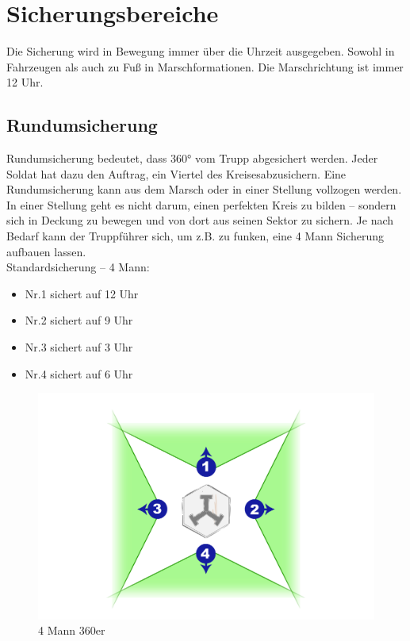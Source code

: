 \pagebreak

\section{Sicherungsbereiche}
	Die Sicherung wird in Bewegung immer über die Uhrzeit ausgegeben. Sowohl in Fahrzeugen als auch zu Fuß in Marschformationen.  Die Marschrichtung ist immer 12 Uhr. \\

\subsection{Rundumsicherung}
	 Rundumsicherung bedeutet, dass 360° vom Trupp abgesichert werden. Jeder Soldat hat dazu den Auftrag, ein Viertel des \glqq Kreises\grqq\space abzusichern. Eine Rundumsicherung kann aus dem Marsch oder in einer Stellung vollzogen werden. In einer Stellung geht es nicht darum, einen perfekten Kreis zu bilden – sondern sich in Deckung zu bewegen und von dort aus seinen Sektor zu sichern. Je nach Bedarf kann der Truppführer sich, um z.B. zu funken, eine 4 Mann Sicherung aufbauen lassen. \\
	Standardsicherung  – 4 Mann: 
		\begin{itemize}
			\item Nr.1 sichert auf 12 Uhr 
			\item Nr.2 sichert auf 9 Uhr 
			\item Nr.3 sichert auf 3 Uhr 
			\item Nr.4 sichert auf 6 Uhr 
		\end{itemize}
		\begin{figure}[htbp]
			\centering
			\includegraphics[width=0.8\linewidth]{./img/grundlagen/sicherungen/360grad_sicherung_4mann.jpg}
			\caption{4 Mann 360er}
		\end{figure}

